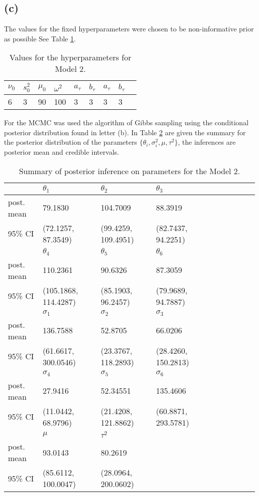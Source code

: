 \documentclass[a4paper, 11pt]{article}
\begin{document}
\subsection*{(c)}

The values for the fixed hyperparameters were chosen to be non-informative prior as possible See Table \ref{m2t1}.

\begin{table}[H]
\centering

\begin{tabular}{lllllllll}
\hline
$\nu_0$  & $s_0^2$ & $\mu_0$ & $\omega^2$ & $a_\tau$ & $b_\tau$ & $a_\tau$ & $b_\tau$ \\

\hline
6      & 3    & 90      & 100     & 3      & 3     & 3    & 3          
       \\    
\hline
\end{tabular}
\caption{Values for the hyperparameters for Model 2.}
\label{m2t1}
\end{table}

For the MCMC was used the algorithm of Gibbs sampling using the conditional posterior distribution found in letter (b). In Table \ref{tabm2} are given the summary for the posterior distribution of the parameters $\{ \theta_i, \sigma_i^2, \mu, \tau^2\}$, the inferences are posterior mean and credible intervals.


\begin{table}[H]
\centering
\begin{tabular}{llllllllll}
\hline
& $\theta_1$ & $\theta_2$ & $\theta_3$  \\
\hline
post. mean & 79.1830   & 104.7009  & 88.3919   \\
95\% CI & (72.1257, 87.3549) &  (99.4259, 109.4951) & (82.7437, 94.2251)\\ 
\hline
& $\theta_4$ & $\theta_5$ &  $\theta_6$ \\
\hline
post. mean  & 110.2361  & 90.6326 &  87.3059 \\
95\% CI  & (105.1868, 114.4287) 	& (85.1903, 96.2457) & (79.9689, 94.7887) \\ 
\hline
& $\sigma_1$ & $\sigma_2$ & $\sigma_3$   \\
\hline
post. mean & 136.7588    & 52.8705  & 66.0206    \\
95\% CI & (61.6617, 300.0546) &  (23.3767, 118.2893) & (28.4260, 150.2813) \\ 
\hline
& $\sigma_4$ & $\sigma_5$ &  $\sigma_6$ \\
\hline
post. mean & 27.9416  & 52.34551 &  135.4606 \\
95\% CI & (11.0442, 68.9796) & (21.4208, 121.8862) & (60.8871, 293.5781) \\ 
\hline
& $\mu$      & $\tau^2$ \\
\hline
post. mean &  93.0143    & 80.2619      \\  
95\% CI & (85.6112, 100.0047) &  (28.0964, 200.0602) & \\
\hline
\end{tabular}
\caption{Summary of posterior inference on parameters for the Model 2.}
\label{tabm2}
\end{table}
\end{document}
